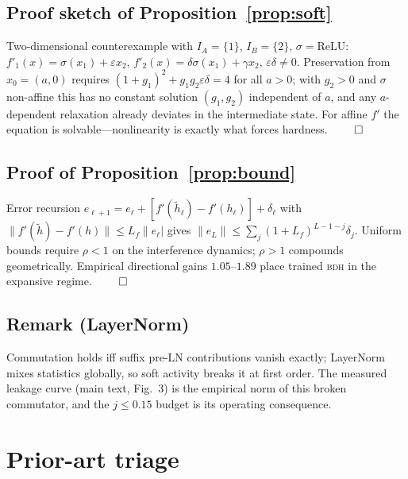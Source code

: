 \documentclass[11pt]{article}
\theoremstyle{remark}\newtheorem{remark}{Remark}
\newcommand{\BDH}{\textsc{bdh}}
\begin{document}
\subsection{Proof sketch of Proposition~\ref{prop:soft}}
Two-dimensional counterexample with $I_A=\{1\}$, $I_B=\{2\}$, $\sigma=\mathrm{ReLU}$:
$f'_1(x)=\sigma(x_1)+\varepsilon x_2$, $f'_2(x)=\delta\sigma(x_1)+\gamma x_2$,
$\varepsilon\delta\neq0$. Preservation from $x_0=(a,0)$ requires
$(1{+}g_1)^2+g_1g_2\varepsilon\delta=4$ for all $a>0$; with $g_2>0$ and $\sigma$
non-affine this has no constant solution $(g_1,g_2)$ independent of $a$, and any
$a$-dependent relaxation already deviates in the intermediate state. For affine $f'$ the
equation is solvable---nonlinearity is exactly what forces hardness. \hfill$\qed$

\subsection{Proof of Proposition~\ref{prop:bound}}
Error recursion $e_{\ell+1}=e_\ell+[f'(\tilde h_\ell)-f'(h_\ell)]+\delta_\ell$ with
$\|f'(\tilde h)-f'(h)\|\le L_f\|e_\ell|$ gives
$\|e_L\|\le\sum_{j}(1+L_f)^{L-1-j}\delta_j$. Uniform bounds require $\rho<1$ on the
interference dynamics; $\rho>1$ compounds geometrically. Empirical directional gains
$1.05$--$1.89$ place trained \BDH{} in the expansive regime. \hfill$\qed$

\subsection{Remark (LayerNorm)}
Commutation holds iff suffix pre-LN contributions vanish exactly; LayerNorm mixes
statistics globally, so soft activity breaks it at first order. The measured leakage curve
(main text, Fig.~3) is the empirical norm of this broken commutator, and the $j\le0.15$
budget is its operating consequence.

\section{Prior-art triage}\label{app:prior}
\end{document}
